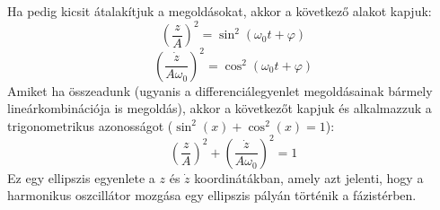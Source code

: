 \documentclass[a4paper,12pt]{article}
\begin{document}
Ha pedig kicsit átalakítjuk a megoldásokat, akkor a következő alakot kapjuk:
\begin{equation}
    (\frac{z}{A})^2 = \sin^2(\omega_0 t + \varphi)
\end{equation}
\begin{equation}
    (\frac{\dot{z}}{A\omega_0})^2 = \cos^2(\omega_0 t + \varphi)
\end{equation}
Amiket ha összeadunk (ugyanis a differenciálegyenlet megoldásainak bármely lineárkombinációja is megoldás), akkor a következőt kapjuk és alkalmazzuk a trigonometrikus azonosságot ($\sin^2(x) + \cos^2(x) = 1$):
\begin{equation}
    (\frac{z}{A})^2 + (\frac{\dot{z}}{A\omega_0})^2 = 1
\end{equation}
Ez egy ellipszis egyenlete a $z$ és $\dot{z}$ koordinátákban, amely azt jelenti, hogy a harmonikus oszcillátor mozgása egy ellipszis pályán történik a fázistérben.
\end{document}

